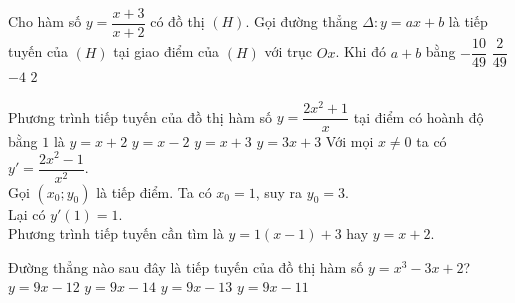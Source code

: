 \begin{ex}%
	Cho hàm số $y=\dfrac{x+3}{x+2}$ có đồ thị $(H)$. Gọi đường thẳng $\Delta \colon y=ax+b$ là tiếp tuyến của $(H)$ tại giao điểm của $(H)$ với trục $Ox$. Khi đó $a+b$ bằng
	\choice
	{$-\dfrac{10}{49}$}
	{$\dfrac{2}{49}$}
	{\True $-4$}
	{$2$}
\end{ex}%
\begin{ex}%
	Phương trình tiếp tuyến của đồ thị hàm số $y=\dfrac{2x^2+1}{x}$ tại điểm có hoành độ bằng $1$ là
	\choice
	{\True $y=x+2$}
	{$y=x-2$}
	{$y=x+3$}
	{$y=3x+3$}
	\loigiai
	{
		Với mọi $x\neq 0$ ta có $y'=\dfrac{2x^2-1}{x^2}$.\\
		Gọi $(x_0;y_0)$ là tiếp điểm. Ta có $x_0=1$, suy ra $y_0 = 3$.\\
		Lại có $y'(1) = 1$.\\
		Phương trình tiếp tuyến cần tìm là $y=1(x-1)+3$ hay $y=x+2$.
	}
\end{ex}%
\begin{ex}%
	Đường thẳng nào sau đây là tiếp tuyến của đồ thị hàm số $y=x^{3}-3x+2$?
	\choice
	{$ y=9x-12 $}
	{\True $ y=9x-14 $}
	{$ y=9x-13 $}
	{$ y=9x-11 $}
\end{ex}%
